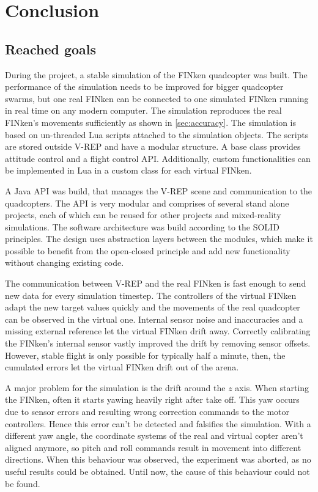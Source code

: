 \chapter{Conclusion}
\label{chap:conclusion}

\section{Reached goals}
\label{sec:conclusionGoals}
During the project, a stable simulation of the FINken quadcopter was built.
The performance of the simulation needs to be improved for bigger quadcopter swarms, but one real FINken can be connected to one simulated FINken running in real time on any modern computer.
The simulation reproduces the real FINken's movements sufficiently as shown in \ref{sec:accuracy}.
The simulation is based on un-threaded Lua scripts attached to the simulation objects.
The scripts are stored outside V-REP and have a modular structure.
A base class provides attitude control and a flight control API.
Additionally, custom functionalities can be implemented in Lua in a custom class for each virtual FINken.


A Java API was build, that manages the V-REP scene and communication to the quadcopters. 
The API is very modular and comprises of several stand alone projects, each of which can be reused for other projects and mixed-reality simulations. The software architecture was build according to the  SOLID \cite{solid} principles.
The design uses abstraction layers between the modules, which make it possible to benefit from the open-closed principle and add new functionality without changing existing code.

The communication between V-REP and the real FINken is fast enough to send new data for every simulation timestep.
The controllers of the virtual FINken adapt the new target values quickly and the movements of the real quadcopter can be observed in the virtual one.
Internal sensor noise and inaccuracies and a missing external reference let the virtual FINken drift away.
Correctly calibrating the FINken's internal sensor vastly improved the drift by removing sensor offsets.
However, stable flight is only possible for typically half a minute, then, the cumulated errors let the virtual FINken drift out of the arena.

A major problem for the simulation is the drift around the $z$ axis.
When starting the FINken, often it starts yawing heavily right after take off.
This yaw occurs due to sensor errors and resulting wrong correction commands to the motor controllers.
Hence this error can't be detected and falsifies the simulation.
With a different yaw angle, the coordinate systems of the real and virtual copter aren't aligned anymore, so pitch and roll commands result in movement into different directions.
When this behaviour was observed, the experiment was aborted, as no useful results could be obtained.
Until now, the cause of this behaviour could not be found.





